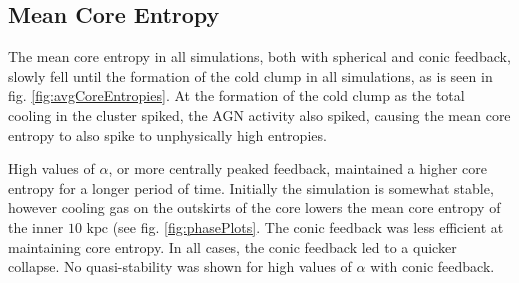 \documentclass[iop,apjl, twocolappendix]{emulateapj}   %
\def\FG#1{{\textcolor{ForestGreen}{\textbf{\textit{ FG: #1}}}}}
\begin{document}

\subsection{Mean Core Entropy} 
\label{sec:mean_core_entropy}

The mean core entropy in all simulations, both with spherical and conic
feedback, slowly fell until the formation of the cold clump in all simulations,
as is seen in fig.  \ref{fig:avgCoreEntropies}. At the formation of the cold
clump as the total cooling in the cluster spiked, the AGN activity also spiked,
causing the mean core entropy to also spike to unphysically high entropies.

High values of $\alpha$, or more centrally peaked feedback, maintained a higher
core entropy for a longer period of time. Initially the simulation is somewhat
stable, however cooling gas on the outskirts of the core lowers the mean core
entropy of the inner $10 \text{ kpc}$ (see fig. \ref{fig:phasePlots}.  The
conic feedback was less efficient at maintaining core entropy. In all cases,
the conic feedback led to a quicker collapse. No quasi-stability was shown for
high values of $\alpha$ with conic feedback.

\end{document}
